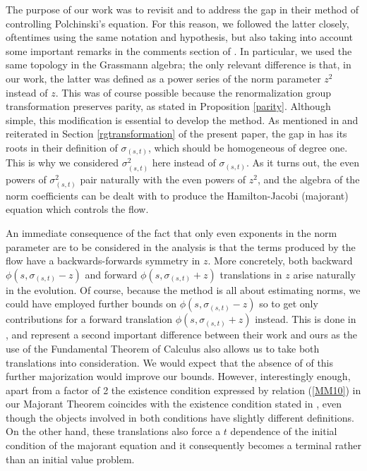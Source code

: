 \documentclass[12pt,twoside]{amsart}
\numberwithin{equation}{section}
\begin{document}
The purpose of our work was to revisit \cite{BryWri} and to address the gap in their method of controlling Polchinski's equation. For this reason, we followed the latter closely, oftentimes using the same notation and hypothesis, but also taking into account some important remarks in the comments section of \cite{SW}. In particular, we used the same topology in the Grassmann algebra; the only relevant difference is that, in our work, the latter was defined as a power series of the norm parameter $z^{2}$ instead of $z$. This was of course possible because the renormalization group transformation preserves parity, as stated in Proposition \ref{parity}. Although simple, this modification is essential to develop the method. As mentioned in \cite{SW} and reiterated in Section \ref{rgtransformation} of the present paper, the gap in \cite{BryWri} has its roots in their definition of $\sigma_{(s,t)}$, which should be homogeneous of degree one. This is why we considered $\sigma_{(s,t)}^{2}$ here instead of $\sigma_{(s,t)}$. As it turns out, the even powers of $\sigma_{(s,t)}^{2}$ pair naturally with the even powers of $z^{2}$, and the algebra of the norm coefficients can be dealt with to produce the Hamilton-Jacobi (majorant) equation which controls the flow. 

An immediate consequence of the fact that only even exponents in the norm parameter are to be considered in the analysis is that the terms produced by the flow have a backwards-forwards symmetry in $z$. More concretely, both backward $\phi(s,\sigma_{(s,t)}-z)$ and forward $\phi(s,\sigma_{(s,t)}+z)$ translations in $z$ arise naturally in the evolution. Of course, because the method is all about estimating norms, we could have employed further bounds on $\phi(s,\sigma_{(s,t)}-z)$ so to get only contributions for a forward translation $\phi(s,\sigma_{(s,t)}+z)$ instead. This is done in \cite{BryWri}, and represent a second important difference between their work and ours as the use of the Fundamental Theorem of Calculus also allows us to take both translations into consideration. We would expect that the absence of of this further majorization would improve our bounds. However, interestingly enough, apart from a factor of 2 the existence condition expressed by relation (\ref{MM10}) in our Majorant Theorem coincides with the existence condition stated in \cite{BryWri}, even though the objects involved in both conditions have slightly different definitions. On the other hand, these translations also force a $t$ dependence of the initial condition of the majorant equation and it consequently becomes a terminal rather than an initial value problem. 
\end{document}

